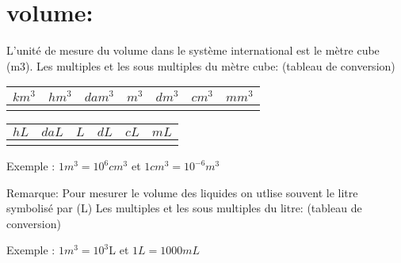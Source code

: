 \documentclass[12pt]{article}
\begin{document}
\section{volume:}
L'unité de mesure du volume dans le système international est le mètre cube (m3).
Les multiples et les sous multiples du mètre cube: (tableau de conversion)
\begin{center}
   \begin{tabular}{ |c|c|c|c|c|c|c| }
      \hline
      $km^3$ & $hm^3$ & $dam^3$ & \bf{$m^3$} & $dm^3$ & $cm^3$ & $mm^3$ \\
      \hline
        &   &    &  &   &   & \\
\hline
\end{tabular}
   \begin{tabular}{ |c|c|c|c|c|c| }
      \hline
       $hL$ & $daL$ & \bf{$L$} & $dL$ & $cL$ & $mL$ \\
      \hline
        &   &    &  &   &    \\
\hline
\end{tabular}
\end{center}

Exemple : $1m^3 = 10^6 cm^3$ et $1cm^3 =  10^{-6} m^3$

Remarque: Pour mesurer le volume des liquides on utlise souvent le litre symbolisé par (L)
Les multiples et les sous multiples du litre: (tableau de conversion)
\begin{center}

\end{center}

Exemple : $1m^3 = 10^3 $L et $1L =  1000 mL$ 
\end{document}
